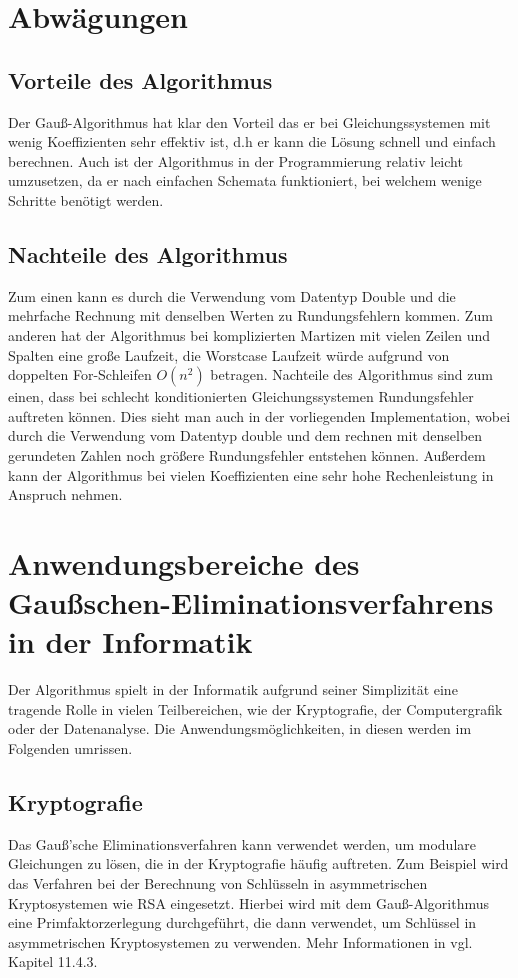 \documentclass[a4paper, 12pt]{report}
\begin{document}
\begin{sloppypar}
{\let\clearpage\relax \chapter{Abwägungen}}

\section{Vorteile des Algorithmus}
Der Gauß-Algorithmus hat klar den Vorteil das er bei Gleichungssystemen mit wenig Koeffizienten
sehr effektiv ist, d.h er kann die Lösung schnell und einfach berechnen.
Auch ist der Algorithmus in der Programmierung relativ leicht umzusetzen,
da er nach einfachen Schemata funktioniert, bei welchem wenige Schritte benötigt werden.
\section{Nachteile des Algorithmus}
Zum einen kann es durch die Verwendung vom Datentyp Double und die mehrfache Rechnung mit denselben Werten zu Rundungsfehlern kommen.
Zum anderen hat der Algorithmus bei komplizierten Martizen mit vielen Zeilen und Spalten eine große Laufzeit,
die Worstcase Laufzeit würde aufgrund von doppelten For-Schleifen $ O(n^2) $ betragen.
Nachteile des Algorithmus sind zum einen, dass bei schlecht konditionierten Gleichungssystemen Rundungsfehler auftreten können.
Dies sieht man auch in der vorliegenden Implementation, wobei durch die Verwendung vom Datentyp double
und dem rechnen mit denselben gerundeten Zahlen noch größere Rundungsfehler entstehen können.
Außerdem kann der Algorithmus bei vielen Koeffizienten eine
sehr hohe Rechenleistung in Anspruch nehmen.
\chapter{Anwendungsbereiche des Gaußschen-Eliminationsverfahrens in der Informatik}
Der Algorithmus spielt in der Informatik aufgrund seiner Simplizität eine tragende Rolle in vielen Teilbereichen,
wie der Kryptografie, der Computergrafik oder der Datenanalyse.
Die Anwendungsmöglichkeiten, in diesen werden im Folgenden umrissen.
\section{Kryptografie}
Das Gauß'sche Eliminationsverfahren kann verwendet werden, um modulare Gleichungen zu lösen,
die in der Kryptografie häufig auftreten.
Zum Beispiel wird das Verfahren bei der Berechnung von Schlüsseln in asymmetrischen Kryptosystemen wie RSA eingesetzt.
Hierbei wird mit dem Gauß-Algorithmus eine Primfaktorzerlegung durchgeführt, die dann
verwendet, um Schlüssel in asymmetrischen Kryptosystemen zu verwenden. Mehr Informationen in \cite{3} vgl. Kapitel 11.4.3.


\end{sloppypar}
\end{document}
